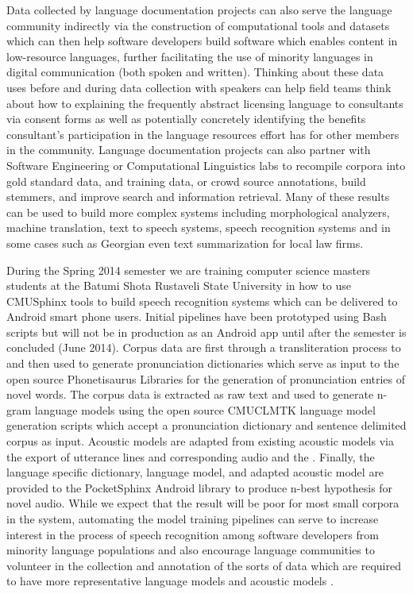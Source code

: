 \documentclass[11pt]{article}
\begin{document}
Data collected by language documentation projects can also serve the language community indirectly via the construction of computational tools and datasets which can then help software developers build software which enables content in low-resource languages, further facilitating the use of minority languages in digital communication (both spoken and written). Thinking about these data uses before and during data collection with speakers can help field teams think about how to explaining the frequently abstract licensing language to consultants via consent forms as well as potentially concretely identifying the benefits  consultant's participation in the language resources effort has for other members in the community. Language documentation projects can also partner with Software Engineering or Computational Linguistics labs to recompile corpora into gold standard data, and training data, or crowd source annotations, build stemmers, and improve search and information retrieval. Many of these results can be used to build more complex systems including morphological analyzers, machine translation, text to speech systems, speech recognition systems and in some cases such as Georgian even text summarization for local law firms.

During the Spring 2014 semester we are training computer science masters students at the Batumi Shota Rustaveli  State University in how to use CMUSphinx tools to build speech recognition systems which can be delivered to Android smart phone users. Initial pipelines have been prototyped using Bash scripts but will not be in production as an Android app until after the semester is concluded (June 2014). Corpus data are first through a transliteration process to and then used to generate pronunciation dictionaries which serve as input  to the open source Phonetisaurus Libraries \cite{Novak:2012} for the generation of pronunciation entries of novel words. The corpus data is extracted as raw text and used to generate n-gram language models using the open source CMUCLMTK \cite{Clarkson:1997} language model generation scripts which accept a pronunciation dictionary and sentence delimited corpus as input. Acoustic models are adapted from existing acoustic models via the export of utterance lines and corresponding audio and the  \cite{Elmahdy:2010}. Finally, the language specific dictionary, language model, and adapted acoustic model are provided to the PocketSphinx Android library to produce n-best hypothesis for novel audio. While we expect that the result will be poor for most small corpora in the system, automating the model training pipelines can serve to increase interest in the process of speech recognition among software developers from minority language populations  and also encourage language communities to volunteer in the collection and annotation of the sorts of data which are required to have more representative language models and acoustic models \cite{Sarfraz:2010}. 
\end{document}
